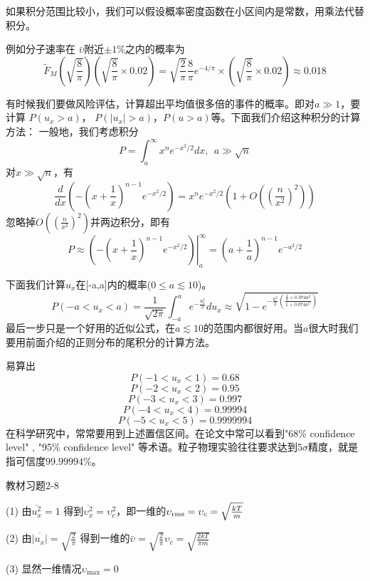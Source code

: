 \documentclass[CJK]{beamer}
\begin{document}
\begin{frame}
\bch
{\scriptsize
如果积分范围比较小，我们可以假设概率密度函数在小区间内是常数，用乘法代替积分。

\skipline

例如分子速率在 $\bar{\upsilon}$附近$\pm 1\%$之内的概率为
$$ \tilde{F}_M(\sqrt{\frac{8}{\pi}}) (\sqrt{\frac{8}{\pi}} \times 0.02) =\sqrt{\frac{2}{\pi}} \frac{8}{\pi}e^{-4/\pi} \times\left(\sqrt{\frac{8}{\pi}}\times 0.02 \right) \approx 0.018  $$
}
\ech
\end{frame}

\begin{frame}
\bch
{\scriptsize
有时候我们要做风险评估，计算超出平均值很多倍的事件的概率。即对$a\gg 1$，要计算
$P(u_x >a)$， $P(|u_x|>a)$，$P(u>a)$等。下面我们介绍这种积分的计算方法：
一般地，我们考虑积分
$$P = \int_a^\infty x^n e^{-x^2/2}dx,  \ \ a\gg \sqrt{n} $$
对$x\gg \sqrt{n}$，有
$$\frac{d}{dx} \left(-\left(x+\frac{1}{x}\right)^{n-1}e^{-x^2/2}\right) = x^n e^{-x^2/2}\left(1+O\left(\left(\frac{n}{x^2}\right)^2\right)\right)$$
忽略掉$O\left(\left(\frac{n}{x^2}\right)^2\right)$并两边积分，即有
$$P \approx \left.\left(-\left(x+\frac{1}{x}\right)^{n-1}e^{-x^2/2}\right)\right\vert_{a}^\infty = \left(a+\frac{1}{a}\right)^{n-1}e^{-a^2/2}$$
}
\ech
\end{frame}

\begin{frame}
\bch
{\scriptsize
下面我们计算$u_x$在[-a,a]内的概率($0\le a \lesssim 10$)。
$$P(-a<u_x<a) = \frac{1}{\sqrt{2\pi}} \int_{-a}^a e^{-\frac{u_x^2}{2}}du_x \approx  \sqrt{1-e^{-\frac{a^2}{2}\left(\frac{\frac{4}{\pi}+ 0.074a^2}{1+0.074a^2}\right)}}$$
最后一步只是一个好用的近似公式，在$a\lesssim 10$的范围内都很好用。当$a$很大时我们要用前面介绍的正则分布的尾积分的计算方法。
}
\ech
\end{frame}

\begin{frame}
\bch
{\scriptsize
易算出
$$P(-1<u_x<1) =  0.68$$
$$P(-2<u_x<2) = 0.95$$
$$P(-3<u_x<3) = 0.997$$
$$P(-4<u_x<4) = 0.99994$$
$$P(-5<u_x<5) = 0.9999994$$
在科学研究中，常常要用到上述置信区间。在论文中常可以看到"68\% confidence level" , "95\% confidence level" 等术语。粒子物理实验往往要求达到$5\sigma$精度，就是指可信度$99.99994\%$。
}
\ech
\end{frame}


\begin{frame}
\bch
{\blue 教材习题2-8}

{\scriptsize
\bitem
\item[(1)]{由$\overline{u_x^2} = 1$ 得到$\overline{\upsilon_x^2} = \upsilon_c^2$，即一维的$\upsilon_{\rm rms} = \upsilon_c = \sqrt{\frac{kT}{m}}$}
\item[(2)]{由$\overline{|u_x|} = \sqrt{\frac{2}{\pi}}$  得到一维的$\bar{\upsilon} =  \sqrt{\frac{2}{\pi}}\upsilon_c = \sqrt{\frac{2kT}{\pi m}}$}
\item[(3)]{显然一维情况$\upsilon_{\max} = 0$}
\eitem

}
\ech
\end{frame}
\end{document}
